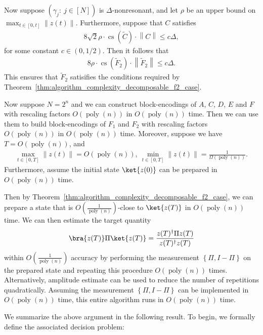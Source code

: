 \documentclass[superscriptaddress,onecolumn,nofootinbib,longbibliography,a4paper,accepted=2026-09-29]{quantumarticle}
\theoremstyle{plain}
\theoremstyle{definition}
\numberwithin{thm}{section}
\numberwithin{assumption}{section}
\numberwithin{lemma}{section}
\numberwithin{prop}{section}
\numberwithin{cor}{section}
\numberwithin{definition}{section}
\numberwithin{rmk}{section}
\numberwithin{equation}{section}
\newcommand{\norm}[1]     {\left\| #1 \right\|}
\newcommand{\lrb}[1]{\left ( #1 \right )}
\newcommand{\lrcb}[1]{\left \{ #1 \right \}}
\newcommand{\mypoly}[1]{\operatorname{poly} \lrb{#1}}
\newcommand{\myO}[1]{O\lrb{#1}}
\newcommand{\myOmega}[1]{\Omega\lrb{#1}}
\begin{document}
Now suppose $\lrb{\gamma_j:~j\in [N]}$ is $\Delta$-nonresonant, and let $\rho$ be an upper bound on $\max_{t \in [0,t]}\norm{z(t)}$. Furthermore, suppose that $C$ satisfies 
\begin{align}
    8 \sqrt{2} \rho  \cdot \operatorname{cs}(\tilde{C}) \cdot  \norm{C} \le c \Delta,
\end{align}
for some constant $c \in (0, 1/2)$. Then it follows that
\begin{align}
    8 \rho \cdot \operatorname{cs}(\tilde{F}_2)\cdot \norm{\tilde{F}_2} \le c \Delta.
\end{align}
This ensures that $\tilde{F}_2$ satisifies the conditions required by Theorem~\ref{thm:algorithm_complexity_decomposable_f2_case}.

Now suppose $N=2^n$ and we can construct block-encodings of $A$, $C$, $D$, $E$ and $F$ with rescaling factors $\myO{\mypoly{n}}$ in $\myO{\mypoly{n}}$ time.
Then we can use them to build block-encodings of $F_1$ and $F_2$ with rescaling factors $\myO{\mypoly{n}}$ in $\myO{\mypoly{n}}$ time. Moreover, suppose we have $T=\myO{\mypoly{n}}$, and
\begin{align}
\max_{t\in [0, T]} \norm{z(t)}=\myO{\mypoly{n}}, ~    
\min_{t\in [0, T]} \norm{z(t)}=\frac{1}{\myOmega{\mypoly{n}}}.
\end{align} 
Furthermore, assume the initial state $\ket{z(0)}$ can be prepared in $\myO{\mypoly{n}}$ time. 

Then by Theorem~\ref{thm:algorithm_complexity_decomposable_f2_case}, we can prepare a state that is $\myO{\frac{1}{\mypoly{n}}}$-close to $\ket{z(T)}$ in $\myO{\mypoly{n}}$ time. We can then estimate the target quantity
\[
\bra{z(T)}\Pi \ket{z(T)}=\frac{z(T)^\dagger \Pi z(T)}{ z(T)^\dagger z(T)}    
\]
within $\myO{\frac{1}{\mypoly{n}}}$ accuracy by performing the measurement $\lrcb{\Pi, I-\Pi}$ on the prepared state and repeating this procedure $\myO{\mypoly{n}}$ times. Alternatively, amplitude estimate can be used to reduce the number of repetitions quadratically. Assuming the measurement $\lrcb{\Pi, I-\Pi}$ can be implemented in $\myO{\mypoly{n}}$ time, this entire algorithm runs in $\myO{\mypoly{n}}$ time.

We summarize the above argument in the following result. To begin, we formally define the associated decision problem:
\end{document}
